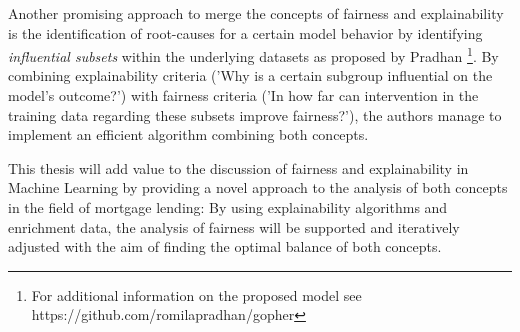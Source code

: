 

Another promising approach to merge the concepts of fairness and explainability is the identification of root-causes for a certain model behavior by identifying \textit{influential subsets} within the underlying datasets as proposed by Pradhan \parencite{Pradhan2022}\footnote{For additional information on the proposed model see https://github.com/romilapradhan/gopher}.
By combining explainability criteria ('Why is a certain subgroup influential on the model's outcome?') with fairness criteria ('In how far can intervention in the training data regarding these subsets improve fairness?'), the authors manage to implement an efficient algorithm combining both concepts.


This thesis will add value to the discussion of fairness and explainability in Machine Learning by providing a novel approach to the analysis of both concepts in the field of mortgage lending: 
By using explainability algorithms and enrichment data, the analysis of fairness will be supported and iteratively adjusted with the aim of finding the optimal balance of both concepts.